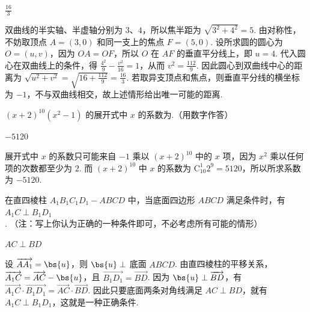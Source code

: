 \documentclass[UTF8,a4paper,oneside,11pt]{ctexbook}
\begin{document}
\begin{answer}
\(\frac{16}{3}\)
\end{answer}

\begin{solution}
双曲线的半实轴、半虚轴分别为 \(3\)、\(4\)，所以焦半距为 \(\sqrt{3^2+4^2}=5\). 由对称性，不妨取顶点 \(A=(3,0)\) 和同一支上的焦点 \(F=(5,0)\). 设所求圆的圆心为 \(O=(u,v)\)，因为 \(OA=OF\)，所以 \(O\) 在 \(AF\) 的垂直平分线上，即 \(u=4\). 代入圆心在双曲线上的条件，得
\(\frac{4^2}{9}-\frac{v^2}{16}=1\)，从而 \(v^2=\frac{112}{9}\). 因此圆心到双曲线中心的距离为
\(\sqrt{u^2+v^2}=\sqrt{16+\frac{112}{9}}=\frac{16}{3}\). 若取异支顶点和焦点，则垂直平分线的横坐标为 \(-1\)，不与双曲线相交，故上述情形给出唯一可能的距离.
\end{solution}

\begin{problem}
\((x + 2)^{10}(x^{2} - 1)\) 的展开式中 \(x\) 的系数为\fillinblank{}.（用数字作答）
\end{problem}

\begin{answer}
\(-5120\)
\end{answer}

\begin{solution}
展开式中 \(x\) 的系数只可能来自 \(-1\) 乘以 \((x+2)^{10}\) 中的 \(x\) 项，因为 \(x^2\) 乘以任何项的次数都至少为 \(2\). 而
\((x+2)^{10}\) 中 \(x\) 的系数为 \(\mathrm C_{10}^{1}2^{9}=5120\)，所以所求系数为 \(-5120\).
\end{solution}

\begin{problem}
在直四棱柱 \(A_{1}B_{1}C_{1}D_{1} - ABCD\) 中，当底面四边形 \(ABCD\) 满足条件\fillinblank{}时，有 \(A_{1}C \perp B_{1}D_{1}\). （注：写上你认为正确的一种条件即可，不必考虑所有可能的情形）
\end{problem}

\begin{answer}
\(AC\perp BD\)
\end{answer}

\begin{solution}
设 \(\overrightarrow{AA_{1}}=\bs{u}\)，则 \(\bs{u}\perp\) 底面 \(ABCD\). 由直四棱柱的平移关系，
\(\overrightarrow{A_{1}C}=\overrightarrow{AC}-\bs{u}\)，且 \(\overrightarrow{B_{1}D_{1}}=\overrightarrow{BD}\). 因为 \(\bs{u}\perp\overrightarrow{BD}\)，有
\(\overrightarrow{A_{1}C}\cdot\overrightarrow{B_{1}D_{1}}=\overrightarrow{AC}\cdot\overrightarrow{BD}\). 因此只要底面两条对角线满足 \(AC\perp BD\)，就有 \(A_{1}C\perp B_{1}D_{1}\)，这就是一种正确条件.
\end{solution}
\end{document}
